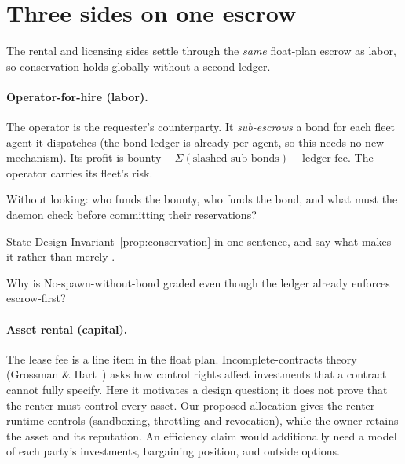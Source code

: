 \documentclass[11pt,a4paper]{article}
\theoremstyle{definition}
\theoremstyle{definition}
\theoremstyle{remark}
\begin{document}




\section{Three sides on one escrow}\label{sec:three-on-one}

The rental and licensing sides settle through the \emph{same}
float-plan escrow as labor, so conservation holds globally without a second ledger.

\paragraph{Operator-for-hire (labor).} The operator is the requester's
counterparty. It \emph{sub-escrows} a bond for each fleet agent it dispatches (the
bond ledger is already per-agent, so this needs no new mechanism). Its profit is
$\text{bounty} - \Sigma(\text{slashed sub-bonds}) - \text{ledger fee}$. The
operator carries its fleet's risk.

\pdexercisepointer*{\ref{ex:he-partial-settlement-trace}}{\ref{ex:he-plan-stub}}{\pageref{ex:he-partial-settlement-trace}}

\begin{pdrecitation}
\item Without looking: who funds the bounty, who funds the bond, and what must the daemon check before committing their reservations?
\item State Design Invariant~\ref{prop:conservation} in one sentence, and say what makes it \Built{} rather than merely \Designed{}.
\item Why is No-spawn-without-bond graded \BuiltWeak{} even though the ledger already enforces escrow-first?
\end{pdrecitation}

\paragraph{Asset rental (capital).} The lease fee is a line item in the float plan.
Incomplete-contracts theory (Grossman \& Hart~) asks how
control rights affect investments that a contract cannot fully specify. Here it
motivates a design question; it does not prove that the renter must control
every asset. Our proposed allocation gives the renter runtime controls
(sandboxing, throttling and revocation), while the owner retains the asset
and its reputation. An efficiency claim would additionally need a model of
each party's investments, bargaining position, and outside options.
\end{document}
